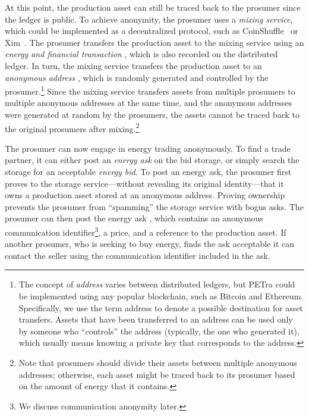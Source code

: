 At this point, the production asset can still be traced back to the
prosumer since the ledger is public.  To achieve anonymity, the
prosumer uses a \emph{mixing service}, which could be implemented as a
decentralized protocol, such as
CoinShuffle~\cite{ruffing2014coinshuffle} or
Xim~\cite{bissias2014sybil}.  The prosumer transfers the production
asset to the mixing service using an \emph{energy and financial
  transaction} , which is also recorded on the distributed
ledger.  In turn, the mixing service transfers the production asset to
an \emph{anonymous address} , which is randomly generated
and controlled by the prosumer.\footnote{The concept of \emph{address}
  varies between distributed ledgers, but PETra could be implemented
  using any popular blockchain, such as Bitcoin and Ethereum.
  Specifically, we use the term address to denote a possible
  destination for asset transfers.  Assets that have been transferred
  to an address can be used only by someone who ``controls'' the
  address (typically, the one who generated it), which usually means
  knowing a private key that corresponds to the address.}  Since the
mixing service transfers assets from multiple prosumers to multiple
anonymous addresses at the same time, and the anonymous addresses were
generated at random by the prosumers, the assets cannot be traced back
to the original prosumers after mixing.\footnote{Note that prosumers
  should divide their assets between multiple anonymous addresses;
  otherwise, each asset might be traced back to its prosumer based on
  the amount of energy that it contains.}

The prosumer can now engage in energy trading anonymously.  To find a
trade partner, it can either post an \emph{energy ask} on the bid
storage, or simply search the storage for an acceptable \emph{energy
  bid}.  To post an energy ask, the prosumer first proves to the
storage service---without revealing its original identity---that it
owns a production asset stored at an anonymous address.  
Proving ownership prevents the prosumer from ``spamming'' the storage service
with bogus asks.  The prosumer can then post the energy ask
, which contains an anonymous communication
identifier\footnote{We discuss communication anonymity later.}, a
price, and a reference to the production asset.  If another prosumer,
who is seeking to buy energy, finds the ask acceptable it can contact
the seller using the communication identifier included in the ask.

